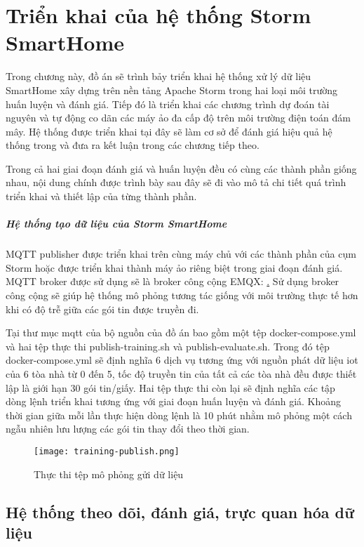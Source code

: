 \chapter{Triển khai của hệ thống Storm SmartHome}

Trong chương này, đồ án sẽ trình bảy triển khai hệ thống xử lý dữ liệu SmartHome xây dựng trên nền tảng Apache Storm trong hai loại môi trường huấn luyện và đánh giá. Tiếp đó là triển khai các chương trình dự đoán tài nguyên và tự động co dãn các máy ảo đa cấp độ trên môi trường điện toán đám mây. Hệ thống được triển khai tại đây sẽ làm cơ sở để đánh giá hiệu quả hệ thống trong và đưa ra kết luận trong các chương tiếp theo.

Trong cả hai giai đoạn đánh giá và huấn luyện đều có cùng các thành phần giống nhau, nội dung chính được trình bày sau đây sẽ đi vào mô tả chi tiết quá trình triển khai và thiết lập của từng thành phần.

\paragraph{Hệ thống tạo dữ liệu của Storm SmartHome}

MQTT publisher được triển khai trên cùng máy chủ với các thành phần của cụm Storm hoặc được triển khai thành máy ảo riêng biệt trong giai đoạn đánh giá. MQTT broker được sử dụng sẽ là broker công cộng EMQX: \href{broker.emqx.io}. Sử dụng broker công cộng sẽ giúp hệ thống mô phỏng tương tác giống với môi trường thực tế hơn khi có độ trễ giữa các gói tin được truyền đi.

Tại thư mục mqtt của bộ nguồn của đồ án \autocite{lemionday_thesis_storm} bao gồm một tệp docker-compose.yml và hai tệp thực thi publish-training.sh và publish-evaluate.sh. Trong đó tệp docker-compose.yml sẽ định nghĩa 6 dịch vụ tương ứng với nguồn phát dữ liệu iot của 6 tòa nhà từ 0 đến 5, tốc độ truyền tin của tất cả các tòa nhà đều được thiết lập là giới hạn 30 gói tin/giấy. Hai tệp thực thi còn lại sẽ định nghĩa các tập dòng lệnh triển khai tương ứng với giai đoạn huấn luyện và đánh giá. Khoảng thời gian giữa mỗi lần thực hiện dòng lệnh là 10 phút nhằm mô phỏng một cách ngẫu nhiên lưu lượng các gói tin thay đổi theo thời gian.

\begin{figure}[H]
    \centering
    \texttt{[image: training-publish.png]}
    \caption{Thực thi tệp mô phỏng gửi dữ liệu}
\end{figure}

\section{Hệ thống theo dõi, đánh giá, trực quan hóa dữ liệu}

